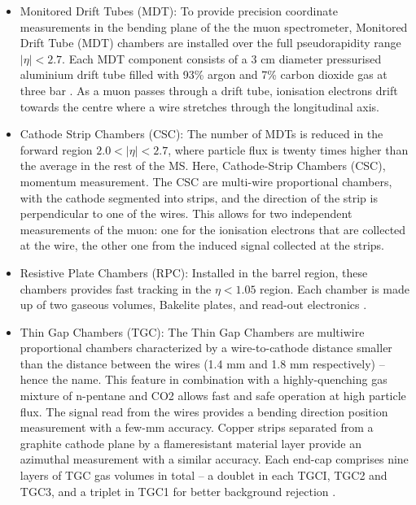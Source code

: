 \begin{itemize}
    \item Monitored Drift Tubes (MDT): To provide precision coordinate measurements in the bending plane of the the muon spectrometer, Monitored Drift Tube (MDT) chambers are installed over the full pseudorapidity range $|\eta| < 2.7$. Each MDT component consists of a 3 cm diameter pressurised aluminium drift tube filled with 93\% argon and 7\% carbon dioxide gas at three bar \cite{LEVIN2008347}. As a muon passes through a drift tube, ionisation electrons drift towards the centre where a wire stretches through the longitudinal axis. 
    \item Cathode Strip Chambers (CSC): The number of MDTs is reduced in the forward region $2.0 < |\eta| < 2.7$, where particle flux is twenty times higher than the average in the rest of the MS. Here, Cathode-Strip Chambers (CSC), momentum measurement. The CSC are multi-wire proportional chambers, with the cathode segmented into strips, and the direction of the strip is perpendicular to one of the wires. This allows for two independent measurements of the muon: one for the ionisation electrons that are collected at the wire, the other one from the induced signal collected at the strips. 
    \item Resistive Plate Chambers (RPC): Installed in the barrel region, these chambers provides fast tracking in the $\eta<1.05$ region. Each chamber is made up of two gaseous volumes, Bakelite plates, and read-out electronics \cite{PALESTINI2003337}. 
    \item Thin Gap Chambers (TGC): The Thin Gap Chambers are multiwire proportional chambers characterized by a wire-to-cathode distance smaller than the distance between the wires (1.4 mm and 1.8 mm respectively) – hence the name. This feature in combination with a highly-quenching gas mixture of n-pentane and CO2 allows fast and safe operation at high particle flux. The signal read from the wires provides a bending direction position measurement with a few-mm accuracy. Copper strips separated from a graphite cathode plane by a flameresistant material layer provide an azimuthal measurement with a similar accuracy. Each end-cap comprises nine layers of TGC gas volumes in total – a doublet in each TGCI, TGC2 and TGC3, and a triplet in TGC1 for better background rejection .
\end{itemize}

